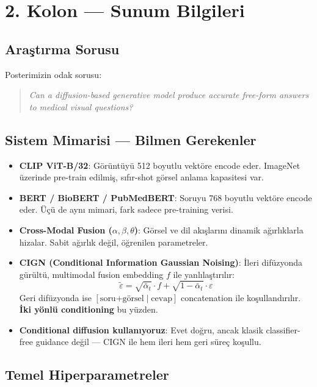 \documentclass[12pt, a4paper]{article}
\begin{document}
\section{2. Kolon — Sunum Bilgileri}

\subsection{Araştırma Sorusu}

Posterimizin odak sorusu:
\begin{quote}
\textit{Can a diffusion-based generative model produce accurate free-form answers to medical visual questions?}
\end{quote}

\subsection{Sistem Mimarisi — Bilmen Gerekenler}

\begin{itemize}
  \item \textbf{CLIP ViT-B/32}: Görüntüyü 512 boyutlu vektöre encode eder. ImageNet üzerinde pre-train edilmiş, sıfır-shot görsel anlama kapasitesi var.
  \item \textbf{BERT / BioBERT / PubMedBERT}: Soruyu 768 boyutlu vektöre encode eder. Üçü de aynı mimari, fark sadece pre-training verisi.
  \item \textbf{Cross-Modal Fusion ($\alpha, \beta, \theta$)}: Görsel ve dil akışlarını dinamik ağırlıklarla hizalar. Sabit ağırlık değil, öğrenilen parametreler.
  \item \textbf{CIGN (Conditional Information Gaussian Noising)}: İleri difüzyonda gürültü, multimodal fusion embedding $f$ ile yanlılaştırılır:
  \[
    \tilde{\varepsilon} = \sqrt{\bar{\alpha}_t} \cdot f + \sqrt{1-\bar{\alpha}_t} \cdot \varepsilon
  \]
  Geri difüzyonda ise $[\text{soru+görsel} \mid \text{cevap}]$ concatenation ile koşullandırılır. \textbf{İki yönlü conditioning} bu yüzden.
  \item \textbf{Conditional diffusion kullanıyoruz}: Evet doğru, ancak klasik classifier-free guidance değil — CIGN ile hem ileri hem geri süreç koşullu.
\end{itemize}

\subsection{Temel Hiperparametreler}
\end{document}
